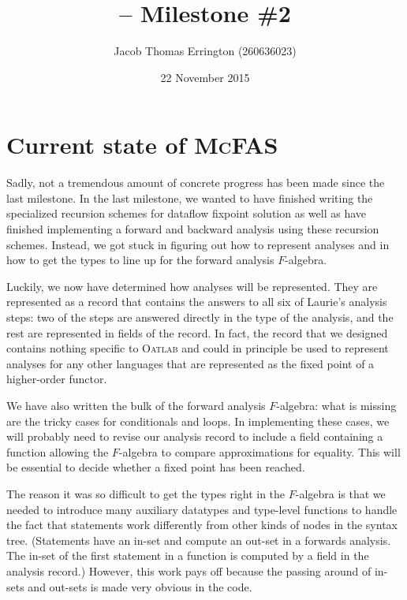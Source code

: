 \documentclass[letterpaper,11pt]{article}
\author{Jacob Thomas Errington (260636023)}
\title{\mcfas{} -- Milestone \#2}
\date{22 November 2015}
\newcommand{\mcfas}{\textsc{McFAS}}
\newcommand{\oatlab}{\textsc{Oatlab}}
\begin{document}
\maketitle

\section{Current state of \mcfas{}}

Sadly, not a tremendous amount of concrete progress has been made since the
last milestone. In the last milestone, we wanted to have finished writing the
specialized recursion schemes for dataflow fixpoint solution as well as have
finished implementing a forward and backward analysis using these recursion
schemes. Instead, we got stuck in figuring out how to represent analyses and in
how to get the types to line up for the forward analysis $F$-algebra.

Luckily, we now have determined how analyses will be represented.
They are represented as a record that contains the answers to all six of
Laurie's analysis steps: two of the steps are answered directly in the type of
the analysis, and the rest are represented in fields of the record. In fact,
the record that we designed contains nothing specific to \oatlab{} and could
in principle be used to represent analyses for any other languages that are
represented as the fixed point of a higher-order functor.

We have also written the bulk of the forward analysis $F$-algebra: what is
missing are the tricky cases for conditionals and loops. In implementing these
cases, we will probably need to revise our analysis record to include a field
containing a function allowing the $F$-algebra to compare approximations for
equality. This will be essential to decide whether a fixed point has been
reached.

The reason it was so difficult to get the types right in the $F$-algebra is
that we needed to introduce many auxiliary datatypes and type-level functions
to handle the fact that statements work differently from other kinds of nodes
in the syntax tree. (Statements have an in-set and compute an out-set in a
forwards analysis. The in-set of the first statement in a function is computed
by a field in the analysis record.) However, this work pays off because the
passing around of in-sets and out-sets is made very obvious in the code.
\end{document}
